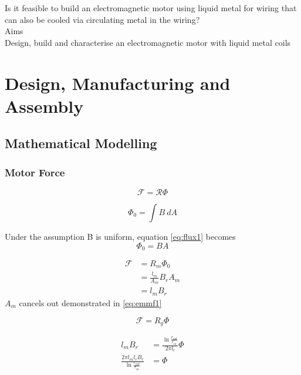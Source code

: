 \documentclass[a4paper]{article}
\begin{document}
Is it feasible to build an electromagnetic motor using liquid metal for wiring that can also be cooled via circulating metal in the wiring? \\

Aims \\

Design, build and characterise an electromagnetic motor with liquid metal coils\\

\newpage

\section{Design, Manufacturing and Assembly}
\subsection{Mathematical Modelling}
\subsubsection{Motor Force}
\begin{equation} \label{eq:emmfdef}
\mathcal{F}=\mathcal{R} \Phi
\end{equation}

\begin{equation} \label{eq:flux1}
\Phi_0 = \int{B\ dA}
\end{equation}

Under the assumption B is uniform, equation \ref{eq:flux1} becomes
\begin{equation}
\Phi_0 = BA
\end{equation}

\begin{equation}\label{eq:emmf1}
\begin{split}
\mathcal{F} & = R_m \Phi_0\\
& = \frac{l_m}{A_m}B_r A_m\\
& = l_m B_r
\end{split}
\end{equation}
$A_m$ cancels out demonstrated in \ref{eq:emmf1}

\begin{equation}\label{eq:emmfreal}
\mathcal{F}=R_g\Phi
\end{equation}

\begin{equation}\label{eq:emmfsubbed}
\begin{split}
l_m B_r & = \frac{\ln{\frac{r_{out}}{r_{in}}}}{2\pi l_c}\Phi\\
\frac{2\pi l_m l_c B_r}{\ln{\frac{r_{out}}{r_{in}}}} & = \Phi\\
\end{split}
\end{equation}
\end{document}
